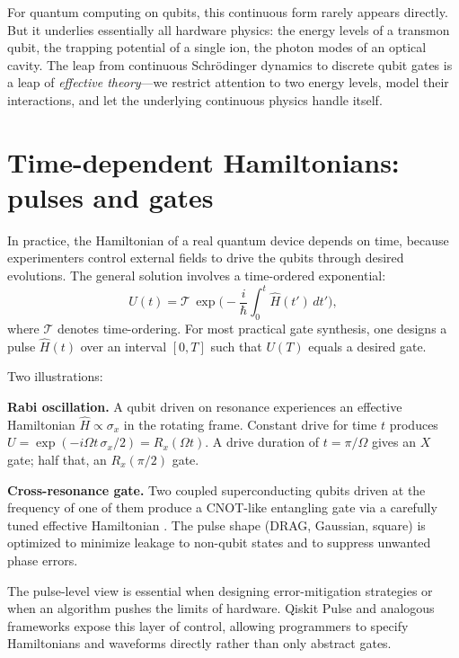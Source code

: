 For quantum computing on qubits, this continuous form rarely appears directly. But it underlies essentially all hardware physics: the energy levels of a transmon qubit, the trapping potential of a single ion, the photon modes of an optical cavity. The leap from continuous Schr\"odinger dynamics to discrete qubit gates is a leap of \emph{effective theory}---we restrict attention to two energy levels, model their interactions, and let the underlying continuous physics handle itself.

\section{Time-dependent Hamiltonians: pulses and gates}

In practice, the Hamiltonian of a real quantum device depends on time, because experimenters control external fields to drive the qubits through desired evolutions. The general solution involves a time-ordered exponential:
\[
  U(t) = \mathcal{T}\,\exp\!\Big(-\frac{i}{\hbar}\int_0^t \hat H(t')\,dt'\Big),
\]
where $\mathcal{T}$ denotes time-ordering. For most practical gate synthesis, one designs a pulse $\hat H(t)$ over an interval $[0,T]$ such that $U(T)$ equals a desired gate.

Two illustrations:

\textbf{Rabi oscillation.} A qubit driven on resonance experiences an effective Hamiltonian $\hat H \propto \sigma_x$ in the rotating frame. Constant drive for time $t$ produces $U = \exp(-i\Omega t\,\sigma_x/2) = R_x(\Omega t)$. A drive duration of $t = \pi/\Omega$ gives an $X$ gate; half that, an $R_x(\pi/2)$ gate.

\textbf{Cross-resonance gate.} Two coupled superconducting qubits driven at the frequency of one of them produce a CNOT-like entangling gate via a carefully tuned effective Hamiltonian \citep{koch_charge-insensitive_2007}. The pulse shape (DRAG, Gaussian, square) is optimized to minimize leakage to non-qubit states and to suppress unwanted phase errors.

\begin{remark}
The pulse-level view is essential when designing error-mitigation strategies or when an algorithm pushes the limits of hardware. Qiskit Pulse and analogous frameworks expose this layer of control, allowing programmers to specify Hamiltonians and waveforms directly rather than only abstract gates.
\end{remark}

